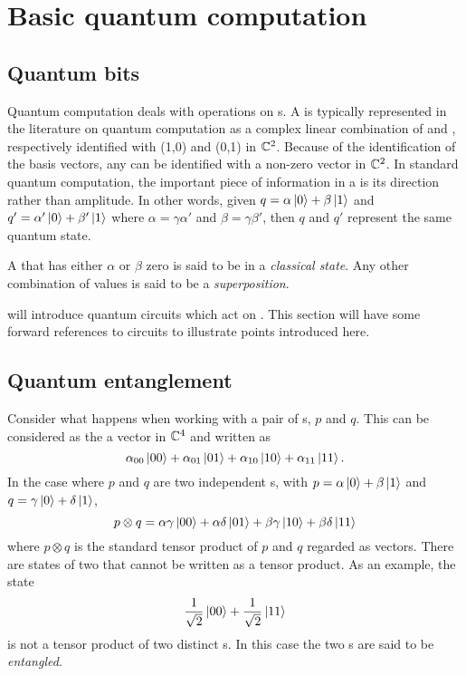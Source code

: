 \section{Basic quantum computation}\label{sec:appBasicsOfQC}
\subsection{Quantum bits}\label{sec:appQuantumBits}
Quantum computation deals with operations on \qubit{}s. A \qubit{} is typically
represented in the literature on quantum computation as a complex
linear combination of  and , respectively
identified with (1,0) and (0,1) in $\mathbb{C}^2$. Because of the
identification of the basis vectors, any \qubit{} can be identified
with a non-zero vector in $\mathbb{C}^2$.
In standard quantum computation, the important piece of
 information in a \qubit{} is its direction rather than
amplitude. In other words, given $q=\alpha\left\vert{0}\right\rangle+\beta\left\vert{1}\right\rangle$ and
$q'=\alpha'\left\vert{0}\right\rangle+\beta'\left\vert{1}\right\rangle$
where $\alpha = \gamma\alpha'$ and
$\beta = \gamma\beta'$, then $q$ and $q'$ represent the same
quantum state.



A \qubit{} that has either $\alpha$ or $\beta$ zero is said to be in
a \emph{classical state}. Any other combination of values is said to be a
\emph{superposition}.

 will introduce quantum circuits
which act on \qubits{}. This section will have some forward
references to circuits to illustrate points introduced here.

\subsection{Quantum entanglement}\label{sec:appQuantumEntanglement}
Consider what happens when working with a pair of \qubit{}s, $p$ and $q$.
This can be considered as the a vector in $\mathbb{C}^4$ and written as
\begin{equation}
\alpha_{00}\left\vert{00}\right\rangle+\alpha_{01}\left\vert{01}\right\rangle+\alpha_{10}\left\vert{10}\right\rangle+
\alpha_{11}\left\vert{11}\right\rangle.\label{eq:appTwoqubits}
\end{equation}
In the case where $p$ and $q$
are two independent \qubit{}s, with $p=\alpha\left\vert{0}\right\rangle+\beta\left\vert{1}\right\rangle$
and $q=\gamma\left\vert{0}\right\rangle+\delta\left\vert{1}\right\rangle$,
\begin{equation}
p \otimes q = \alpha\gamma\left\vert{00}\right\rangle+\alpha\delta\left\vert{01}\right\rangle+\beta\gamma\left\vert{10}\right\rangle+
\beta\delta\left\vert{11}\right\rangle
\end{equation}
where $p \otimes q$  is the standard tensor product of
$p$ and $q$ regarded as vectors. There are states of two \qubits{}
that cannot be written as a tensor product. As an example, the state
\begin{equation}
\frac{1}{\sqrt{2}}\left\vert{00}\right\rangle +
\frac{1}{\sqrt{2}}\left\vert{11}\right\rangle\label{eq:appEntangledqubits}
\end{equation}
is not  a tensor product of two distinct \qubit{}s.
In this case the two \qubit{}s are said to be \emph{entangled}.

